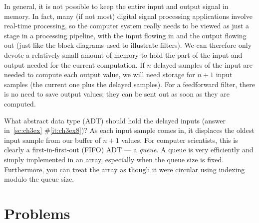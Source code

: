 In general, it is not possible to keep the entire input and output
signal in memory. In fact, many (if not most) digital signal
processing applications involve real-time processing, so the computer
system really needs to be viewed as just a stage in a processing
pipeline, with the input flowing in and the output flowing out (just
like the block diagrams used to illustrate filters).  We can therefore
only devote a relatively small amount of memory to hold the part of
the input and output needed for the current computation. If $n$
delayed samples of the input are needed to compute each output value,
we will need storage for $n+1$ input samples (the current one plus the
delayed samples). For a feedforward filter, there is no need to save
output values; they can be sent out as soon as they are computed.

What abstract data type (ADT) should hold the delayed inputs (answer
in~\ref{sc:ch3ex} \#\ref{it:ch3ex8})?  As each input sample comes in,
it displaces the oldest input sample from our buffer of $n+1$
values. For computer scientists, this is clearly a first-in-first-out (FIFO) ADT --- a \emph{queue}. A queue is very efficiently and simply implemented in an
array, especially when the queue size is fixed. Furthermore, you
can treat the array as though it were circular
using indexing modulo the queue size.

\section{Problems}

